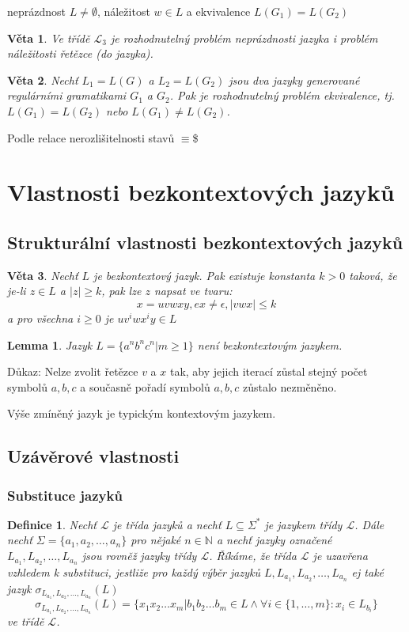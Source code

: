 \documentclass[a4paper, 11pt]{report}
\newtheorem{mydef}{Definice}[chapter]
\newtheorem{veta}{Věta}[chapter]
\newtheorem{lemma}{Lemma}[chapter]
\begin{document}
neprázdnost $L \not= \emptyset$, náležitost $w \in L$ a ekvivalence $L(G_1) = L(G_2)$

\begin{veta}
Ve třídě $\mathcal{L}_3$ je rozhodnutelný problém \emph{neprázdnosti} jazyka i problém \emph{náležitosti} řetězce (do jazyka).
\end{veta}

\begin{veta}
Nechť $L_1 = L(G)$ a $L_2 = L(G_2)$ jsou dva jazyky generované regulárními gramatikami $G_1$ a $G_2$.
Pak je rozhodnutelný problém \emph{ekvivalence}, tj. $L(G_1) = L(G_2)$ nebo $L(G_1) \not= L(G_2)$.
\end{veta}
Podle relace nerozlišitelnosti stavů $\equiv$\$

\section{Vlastnosti bezkontextových jazyků}

\subsection{Strukturální vlastnosti bezkontextových jazyků}

\begin{veta}
Nechť $L$ je bezkontextový jazyk. Pak existuje konstanta $k > 0$ taková, že je-li $z \in L$ a $|z| \geq k$, pak lze $z$ napsat ve tvaru:
$$x = u v w x y, ex \not= \epsilon, |vwx| \leq k$$
a pro všechna $i \geq 0$ je $uv^iwx^iy \in L$
\end{veta}

\begin{lemma}
Jazyk $L = \{a^n b^n c^n | m \geq 1\}$ není bezkontextovým jazykem.
\end{lemma}
Důkaz: Nelze zvolit řetězce $v$ a $x$ tak, aby jejich iterací zůstal stejný počet symbolů $a, b, c$ a současně pořadí symbolů $a, b, c$ zůstalo nezměněno.

Výše zmíněný jazyk je typickým kontextovým jazykem.

\subsection{Uzávěrové vlastnosti}

\subsubsection{Substituce jazyků}
\begin{mydef}
Nechť $\mathcal{L}$ je třída jazyků a nechť $L \subseteq \Sigma^*$ je jazykem třídy $\mathcal{L}$. Dále nechť $\Sigma = \{a_1, a_2, \dots, a_n\}$ pro nějaké $n \in \mathbb{N}$ a nechť jazyky označené $L_{a_1}, L_{a_2}, \dots, L_{a_n}$ jsou rovněž jazyky třídy $\mathcal{L}$. Říkáme, že třída $\mathcal{L}$ je \emph{uzavřena vzhledem k substituci}, jestliže pro každý výběr jazyků $L, L_{a_1}, L_{a_2}, \dots, L_{a_n}$ ej také jazyk $\sigma_{L_{a_1}, L_{a_2}, \dots, L_{a_n}}(L)$
$$\sigma_{L_{a_1}, L_{a_2}, \dots, L_{a_n}}(L) = \{x_1 x_2 \dots x_m | b_1 b_2 \dots b_m \in L \land \forall i \in \{1, \dots, m\} : x_i \in L_{b_i}\} $$
ve třídě $\mathcal{L}$.
\end{mydef}
\end{document}
